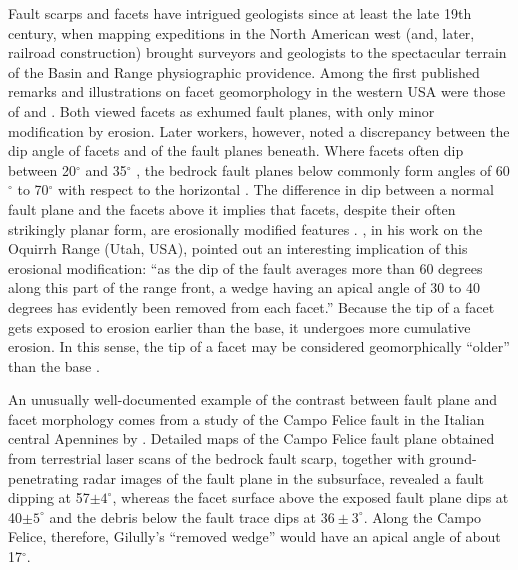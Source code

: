 Fault scarps and facets have intrigued geologists since at least the late 19th century, when mapping expeditions in the North American west (and, later, railroad construction) brought surveyors and geologists to the spectacular terrain of the Basin and Range physiographic providence. Among the first published remarks and illustrations on facet geomorphology in the western USA were those of \citet{gilbert1875report,gilbert1928studies} and \citet{davis1903mountain,davis1909geographical}. Both viewed facets as exhumed fault planes, with only minor modification by erosion. Later workers, however, noted a discrepancy between the dip angle of facets and of the fault planes beneath. Where facets often dip between 20$^\circ$ and 35$^\circ$ \citep{davis1903mountain,davis1909geographical,pack1926new,blackwelder1928recognition,gilluly1928basin,fuller1931geomorphology,anderson1977compound,wallace1978geometry,menges1990soils,petit2009faceted,wilkinson2015slip}, the bedrock fault planes below commonly form angles of 60$^\circ$ to 70$^\circ$ with respect to the horizontal \citep{schneider1925discussion,pack1926new,blackwelder1928recognition,gilluly1928basin,fuller1931geomorphology,wallace1978geometry,wilkinson2015slip}. The difference in dip between a normal fault plane and the facets above it implies that facets, despite their often strikingly planar form, are erosionally modified features \citep{pack1926new,gilluly1928basin}. \citet{gilluly1928basin}, in his work on the Oquirrh Range (Utah, USA), pointed out an interesting implication of this erosional modification: ``as the dip of the fault averages more than 60 degrees along this part of the range front, a wedge having an apical angle of 30 to 40 degrees has evidently been removed from each facet.'' Because the tip of a facet gets exposed to erosion earlier than the base, it undergoes more cumulative erosion. In this sense, the tip of a facet may be considered geomorphically ``older'' than the base \citep{gilbert1928studies,wallace1978geometry,menges1990soils}.

An unusually well-documented example of the contrast between fault plane and facet morphology comes from a study of the Campo Felice fault in the Italian central Apennines by \citet{wilkinson2015slip}. Detailed maps of the Campo Felice fault plane obtained from terrestrial laser scans of the bedrock fault scarp, together with ground-penetrating radar images of the fault plane in the subsurface, revealed a fault dipping at 57$\pm 4^\circ$, whereas the facet surface above the exposed fault plane dips at 40$\pm 5^\circ$ and the debris below the fault trace dips at $36\pm 3^\circ$. Along the Campo Felice, therefore, Gilully's ``removed wedge'' would have an apical angle of about 17$^\circ$.


